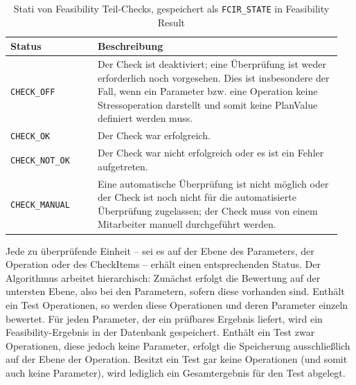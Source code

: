 \begin{table}[htbp]
    \centering
    \footnotesize
    \renewcommand{\arraystretch}{1.3} %
    \label{tab:feasibility-states}
    \begin{tabular}{p{0.25\linewidth} p{0.7\linewidth}}
        \toprule
        \textbf{Status} & \textbf{Beschreibung} \\
        \midrule
        \texttt{CHECK\_OFF} & Der Check ist deaktiviert; eine Überprüfung ist weder erforderlich noch vorgesehen. Dies ist insbesondere der Fall, wenn ein Parameter bzw. eine Operation keine Stressoperation darstellt und somit keine PlanValue definiert werden muss. \\
        \midrule
        \texttt{CHECK\_OK} & Der Check war erfolgreich. \\
        \midrule
        \texttt{CHECK\_NOT\_OK} & Der Check war nicht erfolgreich oder es ist ein Fehler aufgetreten. \\
        \midrule
        \texttt{CHECK\_MANUAL} & Eine automatische Überprüfung ist nicht möglich oder der Check ist noch nicht für die automatisierte Überprüfung zugelassen; der Check muss von einem Mitarbeiter manuell durchgeführt werden. \\
        \bottomrule
    \end{tabular}
    \caption{Stati von Feasibility Teil-Checks, gespeichert als \texttt{FCIR\_STATE} in Feasibility Result}
\end{table}

Jede zu überprüfende Einheit – sei es auf der Ebene des Parameters, der Operation oder des CheckItems – erhält einen entsprechenden Status. Der Algorithmus arbeitet hierarchisch: Zunächst erfolgt die Bewertung auf der untersten Ebene, also bei den Parametern, sofern diese vorhanden sind. Enthält ein Test Operationen, so werden diese Operationen und deren Parameter einzeln bewertet. Für jeden Parameter, der ein prüfbares Ergebnis liefert, wird ein Feasibility-Ergebnis in der Datenbank gespeichert. Enthält ein Test zwar Operationen, diese jedoch keine Parameter, erfolgt die Speicherung ausschließlich auf der Ebene der Operation. Besitzt ein Test gar keine Operationen (und somit auch keine Parameter), wird lediglich ein Gesamtergebnis für den Test abgelegt.

